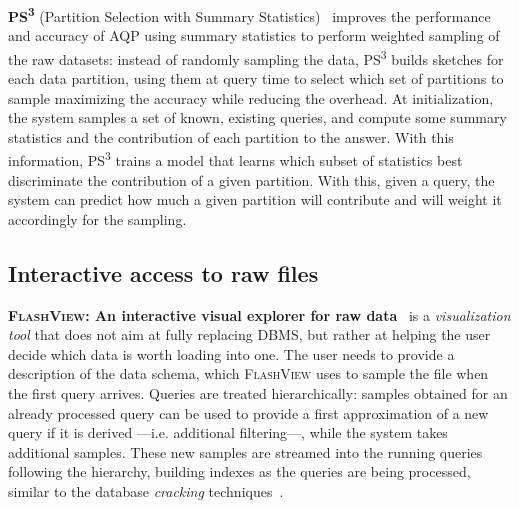 \medskip

\newcommand{\PScube}{PS\textsuperscript{3}\xspace}

\textbf{\PScube} (Partition Selection with Summary Statistics)~\cite{rong_approximate_2020}
improves the performance and accuracy of \gls{AQP} using summary statistics to perform weighted sampling
of the raw datasets: instead of randomly sampling the data, \PScube builds sketches for each data
partition, using them at query time to select which set of partitions to sample maximizing the accuracy
while reducing the overhead. At initialization, the system samples a set of known, existing queries,
and compute some summary statistics and the contribution of each partition to the answer. With this information,
\PScube trains a model that learns which subset of statistics best discriminate the contribution
of a given partition. With this, given a query, the system can predict how much a given partition will
contribute and will weight it accordingly for the sampling.


\subsection{Interactive access to raw files}

\textbf{\textsc{FlashView}: An interactive visual explorer for raw data}~\cite{10.14778/3137765.3137796}
is a \emph{visualization tool} that does not aim at fully replacing \gls{DBMS}, but rather
at helping the user decide which data is worth loading into one. The user needs to provide
a description of the data schema, which \textsc{FlashView} uses to sample the file when the first query
arrives. Queries are treated hierarchically: samples obtained for an already processed query can be
used to provide a first approximation of a new query if it is derived ---i.e. additional filtering---,
while the system takes additional samples. These new samples are streamed into the running queries following
the hierarchy, building indexes as the queries are being processed, similar to the database
\emph{cracking} techniques~\cite{Idreos2007}.

\medskip

